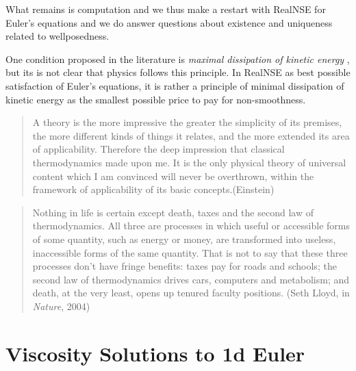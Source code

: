 What remains is computation and we thus make a restart with RealNSE for Euler's equations and we do answer questions about existence and uniqueness related to wellposedness. 


One condition proposed in the literature is \emph{maximal dissipation of kinetic energy} \cite{dafermos}, but its is not clear that physics follows this principle. In RealNSE as best possible 
satisfaction of Euler's equations, it is rather a principle of minimal dissipation of kinetic energy as the smallest possible price to pay for non-smoothness. 


\small
\begin{quote}
A theory is the more impressive the greater the simplicity of its 
premises, the more different kinds of things it relates, and the more 
extended its area of applicability. Therefore the deep impression that 
classical thermodynamics made upon me. It is the only physical theory of 
universal content which I am convinced will never be overthrown, within 
the framework of applicability of its basic concepts.(Einstein)
\end{quote}
\begin{quote}
Nothing in life is certain except death, taxes and the second law of 
thermodynamics. All three are processes in which useful or accessible 
forms of some quantity, such as energy or money, are transformed into 
useless, inaccessible forms of the same quantity. That is not to say 
that these three processes don't have fringe benefits: taxes pay for 
roads and schools; the second law of thermodynamics drives cars, 
computers and metabolism; and death, at the very least, opens up 
tenured faculty positions. (Seth Lloyd, in \emph{Nature}, 2004)
\end{quote}
\normalsize 







\chapter{Viscosity Solutions to 1d Euler}

